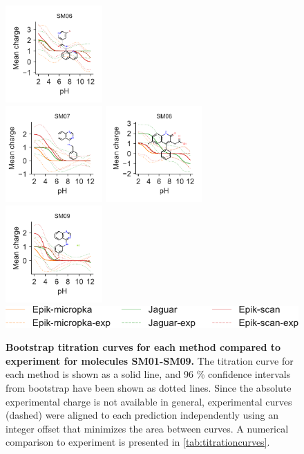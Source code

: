 \documentclass[9pt,lineno,final]{elife}
\begin{document}
\begin{figure}[hbtp]
	\includegraphics[width=0.33\textwidth]{Reports/SM06-titrationcurve-views.pdf}	 \\
		\includegraphics[width=0.33\textwidth]{Reports/SM07-titrationcurve-views.pdf}
	\includegraphics[width=0.33\textwidth]{Reports/SM08-titrationcurve-views.pdf}
	\includegraphics[width=0.33\textwidth]{Reports/SM09-titrationcurve-views.pdf}	 \\
	\includegraphics[]{Reports/overview-legend.pdf}
	\caption{{\bf Bootstrap titration curves for each method compared to experiment for molecules SM01-SM09.} The titration curve for each method is shown as a solid line, and 96 \% confidence intervals from bootstrap have been shown as dotted lines. Since the absolute experimental charge is not available in general, experimental curves (dashed) were aligned to each prediction independently using an integer offset that minimizes the area between curves. A numerical comparison to experiment is presented in \cref{tab:titrationcurves}.
	\label{fig:charge-curves1}}
	\end{figure}
	
\end{document}
